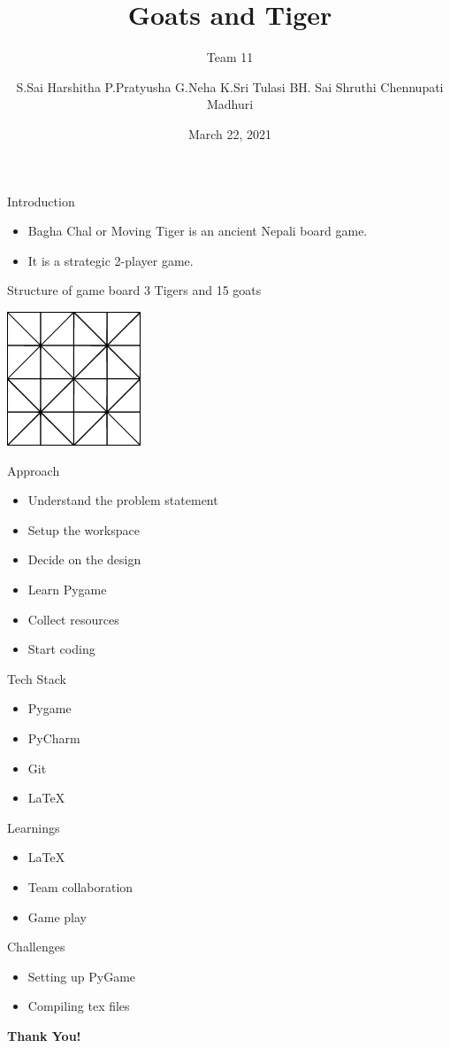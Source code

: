 \documentclass[14pt]{beamer}
\title{Goats and Tiger}
\subtitle{Team 11}
\author[]{S.Sai Harshitha \newline P.Pratyusha \newline G.Neha \newline K.Sri Tulasi \newline BH. Sai Shruthi \newline Chennupati Madhuri}
\date{March 22, 2021}
\begin{document}
\begin{frame}
	\titlepage
\end{frame}
\begin{frame}{Introduction}
	\begin{itemize}
		\item Bagha Chal or Moving Tiger is an ancient Nepali board game.
		\item It is a strategic 2-player game.
	\end{itemize}
\end{frame}

\begin{frame}{Structure of game board}
	3 Tigers and 15 goats
	\begin{center}
		\includegraphics[width=4cm, height=4cm]{goatsTiger_conv.eps}
	\end{center}
\end{frame}
\begin{frame}{Approach}
	\begin{itemize}
		\item Understand the problem statement
		\item Setup the workspace
		\item Decide on the design
		\item Learn Pygame
		\item Collect resources
		\item Start coding
	\end{itemize}
\end{frame}

\begin{frame}{Tech Stack}
	\begin{itemize}
		\item Pygame
        	\item PyCharm
		\item Git
        	\item LaTeX
	\end{itemize}
\end{frame}

\begin{frame}{Learnings}
	\begin{itemize}
		\item LaTeX
		\item Team collaboration
		\item Game play
	\end{itemize}
\end{frame}

\begin{frame}{Challenges}
	\begin{itemize}
		\item Setting up PyGame
		\item Compiling tex files
	\end{itemize}
\end{frame}

\begin{frame}
	\begin{center}
	\textbf{\huge Thank You!}
	\end{center}
\end{frame}
\end{document}
